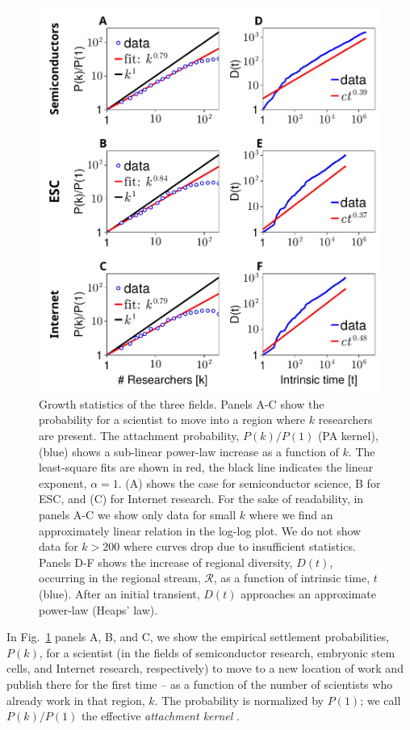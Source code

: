 \documentclass[draft,final]{vutinfth} %
\begin{document}
\begin{figure}[!htb]
\centering
\includegraphics[width=0.8\linewidth]{figures_csf/fig2.pdf}
\caption{Growth statistics of the three fields. 
Panels A-C show the probability for a scientist to move into a region where $k$ researchers are present. The attachment probability, $P(k)/P(1)$ (PA kernel), (blue) shows a sub-linear power-law increase as a function of $k$. The least-square fits are shown in red, the black line indicates the linear exponent, $\alpha=1$. 
(A) shows the case for semiconductor science, B for ESC, and (C) for Internet research. 
For the sake of readability, in panels A-C we show only data for small $k$ where we find an approximately linear relation in the log-log plot. 
We do not show data for $k>200$ where curves drop due to insufficient statistics. Panels D-F shows the increase of regional diversity, $D(t)$, occurring in the regional stream, $\mathcal{R}$, as a function of intrinsic time, $t$ (blue). After an initial transient, $D(t)$ approaches an approximate power-law (Heaps' law).}  
\label{fig:sc-recap}
\end{figure}

In Fig.~\ref{fig:sc-recap} panels A, B, and C, we show the empirical settlement probabilities, $P(k)$, for a scientist (in the fields of semiconductor research, embryonic stem cells, and Internet research, respectively) to move to a new location of work and publish there for the first time -- as a function of the number of scientists who already work in that region, $k$. The probability is normalized by $P(1)$; we call $P(k)/P(1)$ the effective {\em attachment kernel} \cite{Pham15}. 
\end{document}
